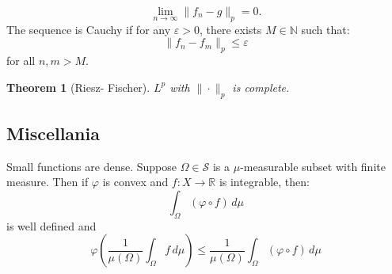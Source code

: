 \documentclass{article}
\newtheorem{theorem}{Theorem}
\theoremstyle{definition}
\numberwithin{theorem}{section}
\numberwithin{equation}{section}
\begin{document}
\begin{equation}
	\lim_{n \rightarrow \infty} \| f_n - g \|_p = 0.
\end{equation}
The sequence is Cauchy if for any $\varepsilon > 0$, there exists $M \in \mathbb{N}$ such that:
\begin{equation}
	\|f_n - f_m \|_{p} \leq \varepsilon
\end{equation}
for all $n, m  > M$. 

\begin{theorem}[Riesz- Fischer]
	$L^p$ with $\| \cdot \|_{p}$ is complete. 
\end{theorem}
\subsection{Miscellania}
Small functions are dense.
Suppose $\Omega \in \mathcal{S}$ is a $\mu$-measurable subset with finite measure. Then if $\varphi$ is convex and $f : X \rightarrow \mathbb{R}$ is integrable, then:
\begin{equation}
	\int_{\Omega} (\varphi \circ f) \, d\mu 
\end{equation}
is well defined
and
\begin{equation}
	\varphi \left(\frac{1}{\mu(\Omega)} \int_{\Omega} f \, d\mu \right)\leq \frac{1}{\mu(\Omega)}\int_{\Omega} (\varphi \circ f) \, d\mu 
\end{equation}
\end{document}

